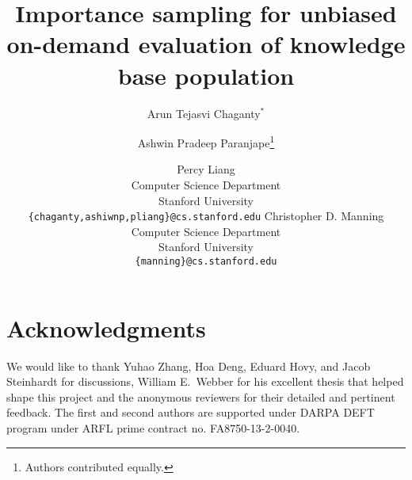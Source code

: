 \documentclass[11pt,letterpaper]{article}
\title{Importance sampling for unbiased on-demand evaluation of knowledge base population}
\author{%
  Arun Tejasvi Chaganty$^*$
\and%
Ashwin Pradeep Paranjape\thanks{\quad Authors contributed equally.} %
\and%
  Percy Liang
  \\
  Computer Science Department \\
  Stanford University \\
  {\tt \{chaganty,ashiwnp,pliang\}@cs.stanford.edu}
\AND%
  Christopher D. Manning \\
  Computer Science Department \\
  Stanford University \\
  {\tt \{manning\}@cs.stanford.edu}
}
\date{}
\begin{document}
\maketitle

\begin{abstract}

\end{abstract}










\section*{Acknowledgments}
We would like to thank Yuhao Zhang, Hoa Deng, Eduard Hovy, and Jacob Steinhardt for discussions, William E.\ Webber for his excellent thesis that helped shape this project and the anonymous reviewers for their detailed and pertinent feedback.
The first and second authors are supported under DARPA DEFT program under ARFL prime contract no. FA8750-13-2-0040.




\appendix


\end{document}
